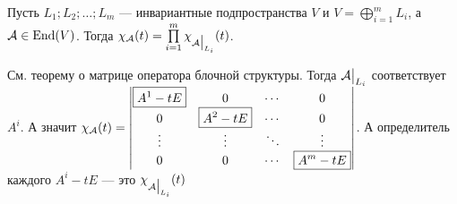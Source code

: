 \documentclass{article}
\begin{document}
\begin{itemize}
\begin{Proof}
        \end{Proof}
        \thm Пусть $L_1;L_2;\ldots;L_m$ --- инвариантные подпространства $V$ и $V=\bigoplus\limits_{i=1}^mL_i$, а ${\mathcal{A}}\in\operatorname{End}(V)$. Тогда $\chi_{\mathcal{A}}(t)=\prod\limits_{i=1}^m\chi_{{\mathcal{A}}\big|_{L_i}}(t)$.
        \begin{Proof}
            См. теорему о матрице оператора блочной структуры. Тогда ${\mathcal{A}}\big|_{L_i}$ соответствует $A^i$. А значит $\chi_{\mathcal{A}}(t)=\left|\begin{matrix}
                \boxed{A^1-tE} & 0 & \cdots & 0\\
                0 & \boxed{A^2-tE} & \cdots & 0\\
                \vdots & \vdots & \ddots & \vdots\\
                0 & 0 & \cdots & \boxed{A^m-tE}\\
            \end{matrix}\right|$. А определитель каждого $A^i-tE$ --- это $\chi_{{\mathcal{A}}\big|_{L_i}}(t)$
        \end{Proof}
    \end{itemize}
\end{document}
